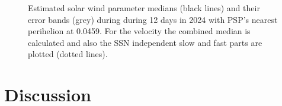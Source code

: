 \begin{figure}
	\caption{Estimated solar wind parameter medians (black lines) and their error bands (grey) during during 12 days in 2024 with PSP's nearest perihelion at \SI{0.0459}{\au}. For the velocity the combined median is calculated and also the SSN independent slow and fast parts are plotted (dotted lines).}
	\label{fig:SPP_perihelia_prediction_nearest_e_plot}
\end{figure}


\section{Discussion}
\label{sec:discussion}

